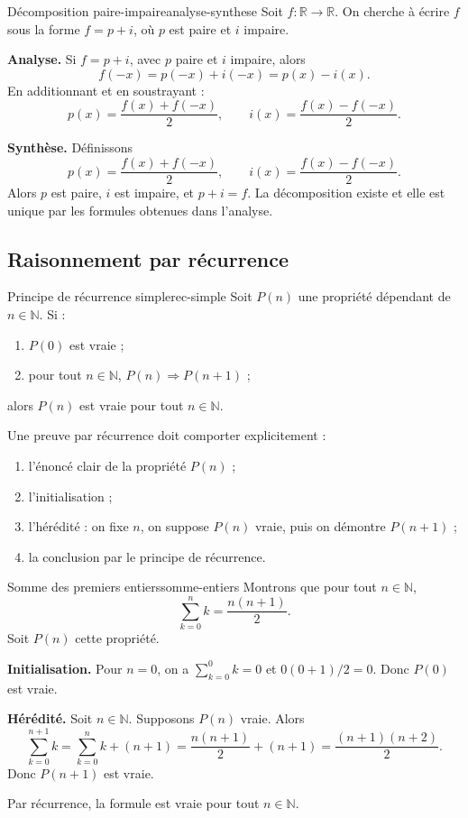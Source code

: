 \documentclass[11pt,a4paper]{article}
\newcommand{\R}{\mathbb{R}}
\newcommand{\N}{\mathbb{N}}
\begin{document}
\begin{exemplebox}{Décomposition paire-impaire}{analyse-synthese}
Soit $f:\R\to\R$. On cherche à écrire $f$ sous la forme $f=p+i$, où $p$ est paire et $i$ impaire.

\textbf{Analyse.} Si $f=p+i$, avec $p$ paire et $i$ impaire, alors
\[
f(-x)=p(-x)+i(-x)=p(x)-i(x).
\]
En additionnant et en soustrayant :
\[
p(x)=\frac{f(x)+f(-x)}2,
\qquad
 i(x)=\frac{f(x)-f(-x)}2.
\]

\textbf{Synthèse.} Définissons
\[
p(x)=\frac{f(x)+f(-x)}2,
\qquad
 i(x)=\frac{f(x)-f(-x)}2.
\]
Alors $p$ est paire, $i$ est impaire, et $p+i=f$. La décomposition existe et elle est unique par les formules obtenues dans l'analyse.
\end{exemplebox}

\subsection{Raisonnement par récurrence}

\begin{theorembox}{Principe de récurrence simple}{rec-simple}
Soit $P(n)$ une propriété dépendant de $n\in\N$. Si :
\begin{enumerate}
  \item $P(0)$ est vraie ;
  \item pour tout $n\in\N$, $P(n)\Rightarrow P(n+1)$ ;
\end{enumerate}
alors $P(n)$ est vraie pour tout $n\in\N$.
\end{theorembox}

\begin{methodebox}
Une preuve par récurrence doit comporter explicitement :
\begin{enumerate}
  \item l'énoncé clair de la propriété $P(n)$ ;
  \item l'initialisation ;
  \item l'hérédité : on fixe $n$, on suppose $P(n)$ vraie, puis on démontre $P(n+1)$ ;
  \item la conclusion par le principe de récurrence.
\end{enumerate}
\end{methodebox}

\begin{exemplebox}{Somme des premiers entiers}{somme-entiers}
Montrons que pour tout $n\in\N$,
\[
\sum_{k=0}^n k=\frac{n(n+1)}2.
\]
Soit $P(n)$ cette propriété.

\textbf{Initialisation.} Pour $n=0$, on a $\sum_{k=0}^0 k=0$ et $0(0+1)/2=0$. Donc $P(0)$ est vraie.

\textbf{Hérédité.} Soit $n\in\N$. Supposons $P(n)$ vraie. Alors
\[
\sum_{k=0}^{n+1}k=\sum_{k=0}^{n}k+(n+1)
=\frac{n(n+1)}2+(n+1)
=\frac{(n+1)(n+2)}2.
\]
Donc $P(n+1)$ est vraie.

Par récurrence, la formule est vraie pour tout $n\in\N$.
\end{exemplebox}
\end{document}
